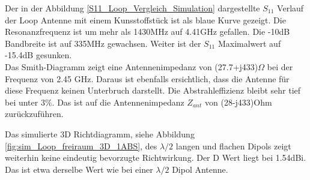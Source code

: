 Der in der  Abbildung \ref{S11_Loop_Vergleich_Simulation} dargestellte $S_{11}$ Verlauf der Loop Antenne mit einem Kunsstoffstück ist als blaue Kurve gezeigt. Die Resonanzfrequenz ist um mehr als 1430MHz auf 4.41GHz gefallen. Die -10dB Bandbreite ist auf 335MHz gewachsen. Weiter ist der $S_{11}$ Maximalwert auf -15.4dB gesunken.\\
Das Smith-Diagramm zeigt eine Antennenimpedanz von (27.7+j433)$\Omega$ bei der Frequenz von 2.45 GHz. Daraus ist ebenfalls ersichtlich, dass die Antenne für diese Frequenz keinen Unterbruch darstellt. Die Abstrahleffizienz bleibt sehr tief bei unter $3\%$. Das ist auf die Antennenimpedanz $Z_{ant}$ von (28-j433)Ohm zurückzuführen.


Das simulierte 3D Richtdiagramm, siehe Abbildung \ref{fig:sim_Loop_freiraum_3D_1ABS}, des $\lambda/2$ langen und flachen Dipols zeigt weiterhin keine eindeutig bevorzugte Richtwirkung. Der D Wert liegt bei 1.54dBi. Das ist etwa derselbe Wert wie bei einer $\lambda/2$ Dipol Antenne.\\




